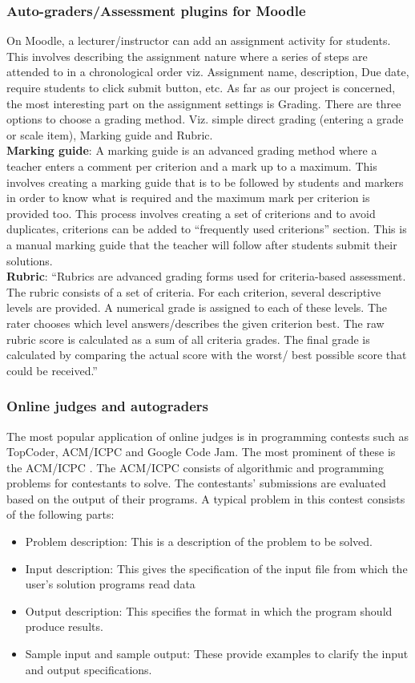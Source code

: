 \documentclass[12pt]{article}
\begin{document}
		 \subsubsection{Auto-graders/Assessment plugins for Moodle}
		 On Moodle, a lecturer/instructor can add an assignment activity for students. This involves describing the 					assignment nature where a series of steps are attended to in a chronological order viz. Assignment name, 					description, Due date, require students to click submit button, etc. As far as our project is concerned, the most 				interesting part on the assignment settings is Grading. There are three options to choose a grading method. Viz. 				simple direct grading (entering a grade or scale item), Marking guide and Rubric. \\
		 \textbf{Marking guide}: A marking guide is an advanced grading method where a teacher enters a comment per 				criterion and a mark up to a maximum. This involves creating a marking guide that is to be followed by students and 			markers in order to know what is required and the maximum mark per criterion is provided too. This process involves 		creating a set of criterions and to avoid duplicates, criterions can be added to “frequently used criterions” section. 			This is a manual marking guide that the teacher will follow after students submit their solutions. \\
		 \textbf{Rubric}: “Rubrics are advanced grading forms used for criteria-based assessment. The rubric consists of a 			set of criteria. For each criterion, several descriptive levels are provided. A numerical grade is assigned to each of 			these levels. The rater chooses which level answers/describes the given criterion best. The raw rubric score is 				calculated as a sum of all criteria grades. The final grade is calculated by comparing the actual score with the worst/			best possible score that could be received.”
		\subsubsection{Online judges and autograders}
		The most popular application of online judges is in programming contests such as TopCoder, ACM/ICPC and Google Code Jam. The most prominent of these is the ACM/ICPC \cite{icpc}. The ACM/ICPC consists of algorithmic and programming problems for contestants to solve. The contestants' submissions are evaluated based on the output of their programs. A typical problem in this contest consists of the following parts:
		\begin{itemize}
			\item Problem description: This is a description of the problem to be solved.
			\item  Input description: This gives the specification of the input file from which the user’s
				solution programs read data
			\item Output description: This specifies the format in which the program should produce
				results.
			\item Sample input and sample output: These provide examples to clarify the input and output
				specifications.
		\end{itemize}
\end{document}
